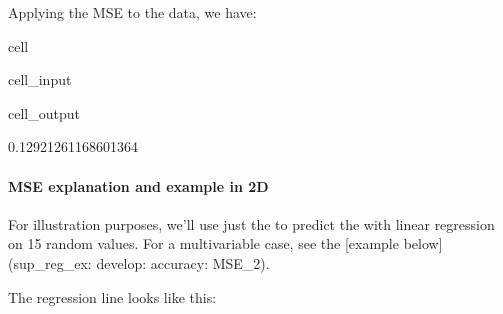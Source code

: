 \documentclass[letterpaper,10pt,english]{jupyterBook}
\begin{document}
\sphinxAtStartPar
Applying the MSE to the  data, we have:

\begin{sphinxuseclass}{cell}\begin{sphinxVerbatimInput}

\begin{sphinxuseclass}{cell_input}
\begin{sphinxVerbatim}[commandchars=\\\{\}]
   

 
\end{sphinxVerbatim}

\end{sphinxuseclass}\end{sphinxVerbatimInput}
\begin{sphinxVerbatimOutput}

\begin{sphinxuseclass}{cell_output}
\begin{sphinxVerbatim}[commandchars=\\\{\}]
0.12921261168601364
\end{sphinxVerbatim}

\end{sphinxuseclass}\end{sphinxVerbatimOutput}

\end{sphinxuseclass}

\paragraph{MSE explanation and example in 2D}
\label{\detokenize{task2_c/example_sup_reg/sup_reg_ex_accuracy:mse-explanation-and-example-in-2d}}\label{\detokenize{task2_c/example_sup_reg/sup_reg_ex_accuracy:sup-reg-ex-develop-accuracy-mse-example}}
\sphinxAtStartPar
For illustration purposes, we’ll use just the  to predict the  with linear regression on 15 random values. For a multi\sphinxhyphen{}variable case, see the {[}example below{]}(sup\_reg\_ex: develop: accuracy: MSE\_2).

\sphinxAtStartPar
The regression line looks like this:
\end{document}
